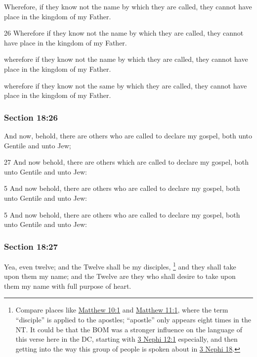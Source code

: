 		Wherefore, if they know not the name by which they are called, they cannot have place in the kingdom of my Father.

		\begin{framed}
		\scriptsize
			\begin{compactdesc}
				\item[JSP] 26 Wherefore if they know not the name by which they are called, they cannot have place in the kingdom of my Father.
				\item[DC 1835] wherefore if they know not the name by which they are called, they cannot have place in the kingdom of my Father.
				\item[DC 1844] wherefore if they know not the same by which they are called, they cannot have place in the kingdom of my Father.
			\end{compactdesc}
		\end{framed}

	\subsubsection{Section 18:26} %
		\label{DC18-26}

		And now, behold, there are others who are called to declare my gospel, both unto Gentile and unto Jew;

		\begin{framed}
		\scriptsize
			\begin{compactdesc}
				\item[JSP] 27 And now behold, there are others which are called to declare my gospel, both unto Gentile and unto Jew: 
				\item[DC 1835] 5 And now behold, there are others who are called to declare my gospel, both unto Gentile and unto Jew: 
				\item[DC 1844] 5 And now behold, there are others who are called to declare my gospel, both unto Gentile and unto Jew: 
			\end{compactdesc}
		\end{framed}

	\subsubsection{Section 18:27} %
		\label{DC18-27}

		Yea, even twelve; and the Twelve shall be my disciples,%
			\footnote{%
				Compare places like \hyperref[MATTHEW-10-1]{Matthew 10:1} and \hyperref[MATTHEW-11-1]{Matthew 11:1}, where the term ``disciple'' is applied to the apostles; ``apostle'' only appears eight times in the NT. It could be that the BOM was a stronger influence on the language of this verse here in the DC, starting with \hyperref[3NEPHI-12-1]{3 Nephi 12:1} especially, and then getting into the way this group of people is spoken about in \hyperref[3NEPHI-18]{3 Nephi 18}. 
				}
		and they shall take upon them my name; and the Twelve are they who shall desire to take upon them my name with full purpose of heart.

